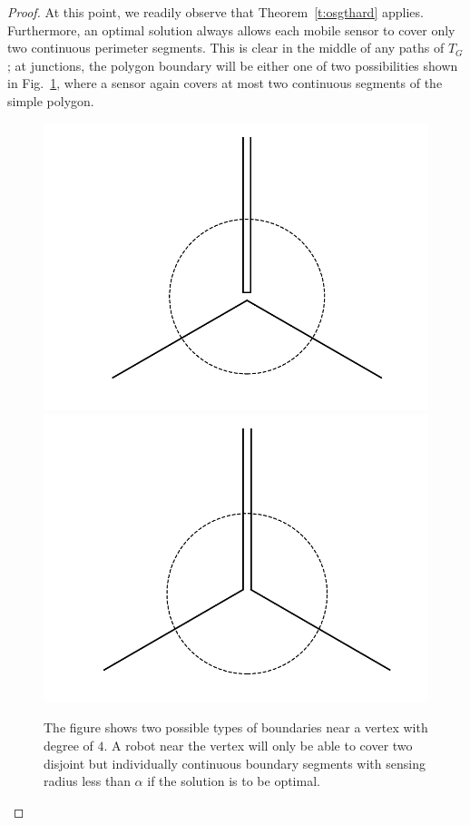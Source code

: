 \begin{proof}
At this point, we readily observe that Theorem~\ref{t:osgthard} applies. 
Furthermore, an optimal solution always allows each mobile sensor to 
cover only two continuous perimeter segments. This is clear in the middle 
of any paths of $T_G$; at junctions, the polygon boundary will be either 
one of two possibilities shown in Fig.~\ref{fig:2types}, where a sensor
again covers at most two continuous segments of the simple polygon. 
\begin{figure}[!ht]
    \centering
    \includegraphics[scale=.29]{chapters/osg/figures/t1-eps-converted-to.pdf}
    \includegraphics[scale=.29]{chapters/osg/figures/t2-eps-converted-to.pdf}
    \caption{The figure shows two possible types of boundaries near a 
		vertex with degree of $4$. A robot near the vertex will only be able 
		to cover two disjoint but individually continuous boundary segments 
		with sensing radius less than $\alpha$ if the solution is to be optimal.}
    \label{fig:2types}
\end{figure}
\end{proof}
